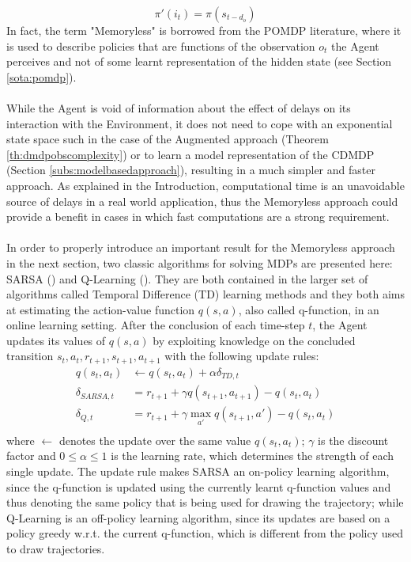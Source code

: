                 \[ \pi'(i_t) = \pi(s_{t-d_o}) \]
                \noindent
                In fact, the term "Memoryless" is borrowed from the POMDP literature, where it is used to describe policies that are functions of the observation $o_t$ the Agent perceives and not of some learnt representation of the hidden state (see Section \ref{sota:pomdp}).
                \\\\
                While the Agent is void of information about the effect of delays on its interaction with the Environment, it does not need to cope with an exponential state space such in the case of the Augmented approach (Theorem \ref{th:dmdpobscomplexity}) or to learn a model representation of the CDMDP (Section \ref{subs:modelbasedapproach}), resulting in a much simpler and faster approach. As explained in the Introduction, computational time is an unavoidable source of delays in a real world application, thus the Memoryless approach could provide a benefit in cases in which fast computations are a strong requirement.
                \\\\
                In order to properly introduce an important result for the Memoryless approach in the next section, two classic algorithms for solving MDPs are presented here: SARSA () and Q-Learning (). They are both contained in the larger set of algorithms called Temporal Difference (TD) learning methods and they both aims at estimating the action-value function $q(s,a)$, also called q-function, in an online learning setting. After the conclusion of each time-step $t$, the Agent updates its values of $q(s,a)$ by exploiting knowledge on the concluded transition $s_t, a_t, r_{t+1}, s_{t+1}, a_{t+1}$ with the following update rules:
                \begin{align*}
                    q(s_t, a_t) &\leftarrow q(s_t, a_t) + \alpha \delta_{TD, t}\\
                    \delta_{SARSA, t}    &= r_{t+1} + \gamma q(s_{t+1}, a_{t+1}) - q(s_t, a_t)\\
                    \delta_{Q, t}        &= r_{t+1} + \gamma \max_{a'} q(s_{t+1}, a') - q(s_t, a_t)\\
                \end{align*}
                where $\leftarrow$ denotes the update over the same value $q(s_t, a_t)$; $\gamma$ is the discount factor and $0 \leq \alpha \leq 1$ is the learning rate, which determines the strength of each single update. The update rule makes SARSA an on-policy learning algorithm, since the q-function is updated using the currently learnt q-function values and thus denoting the same policy that is being used for drawing the trajectory; while Q-Learning is an off-policy learning algorithm, since its updates are based on a policy greedy w.r.t. the current q-function, which is different from the policy used to draw trajectories. \newline
